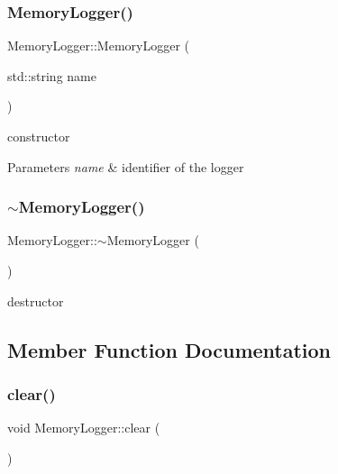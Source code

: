 \subsubsection{\texorpdfstring{Memory\+Logger()}{MemoryLogger()}}
{\footnotesize\ttfamily Memory\+Logger\+::\+Memory\+Logger (\begin{DoxyParamCaption}\item[{std\+::string}]{name }\end{DoxyParamCaption})}

constructor 
\begin{DoxyParams}{Parameters}
{\em name} & identifier of the logger \\
\hline
\end{DoxyParams}
\mbox{\label{classez_1_1logging_1_1MemoryLogger_a421c0b502e122f86d5c5fbfa1660d6ee}} 
\subsubsection{\texorpdfstring{$\sim$\+Memory\+Logger()}{~MemoryLogger()}}
{\footnotesize\ttfamily Memory\+Logger\+::$\sim$\+Memory\+Logger (\begin{DoxyParamCaption}{ }\end{DoxyParamCaption})}

destructor 

\subsection{Member Function Documentation}
\mbox{\label{classez_1_1logging_1_1MemoryLogger_afa6c630d5e6334495f05727cdb7c3b16}} 
\subsubsection{\texorpdfstring{clear()}{clear()}}
{\footnotesize\ttfamily void Memory\+Logger\+::clear (\begin{DoxyParamCaption}{ }\end{DoxyParamCaption})}

